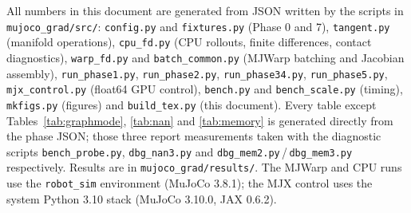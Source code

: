 \documentclass[11pt,a4paper]{article}
\newcommand{\code}[1]{\texttt{\small #1}}
\begin{document}
All numbers in this document are generated from JSON written by the scripts in
\code{mujoco\_grad/src/}:
\code{config.py} and \code{fixtures.py} (Phase 0 and 7),
\code{tangent.py} (manifold operations),
\code{cpu\_fd.py} (CPU rollouts, finite differences, contact diagnostics),
\code{warp\_fd.py} and \code{batch\_common.py} (MJWarp batching and Jacobian assembly),
\code{run\_phase1.py}, \code{run\_phase2.py}, \code{run\_phase34.py}, \code{run\_phase5.py},
\code{mjx\_control.py} (float64 GPU control),
\code{bench.py} and \code{bench\_scale.py} (timing),
\code{mkfigs.py} (figures) and \code{build\_tex.py} (this document).
Every table except Tables~\ref{tab:graphmode}, \ref{tab:nan} and \ref{tab:memory} is
generated directly from the phase JSON; those three report measurements taken with the
diagnostic scripts \code{bench\_probe.py}, \code{dbg\_nan3.py} and
\code{dbg\_mem2.py}\,/\,\code{dbg\_mem3.py} respectively.
Results are in \code{mujoco\_grad/results/}. The MJWarp and CPU runs use the
\code{robot\_sim} environment (MuJoCo 3.8.1); the MJX control uses the
system Python 3.10 stack (MuJoCo 3.10.0, JAX 0.6.2).
\end{document}
